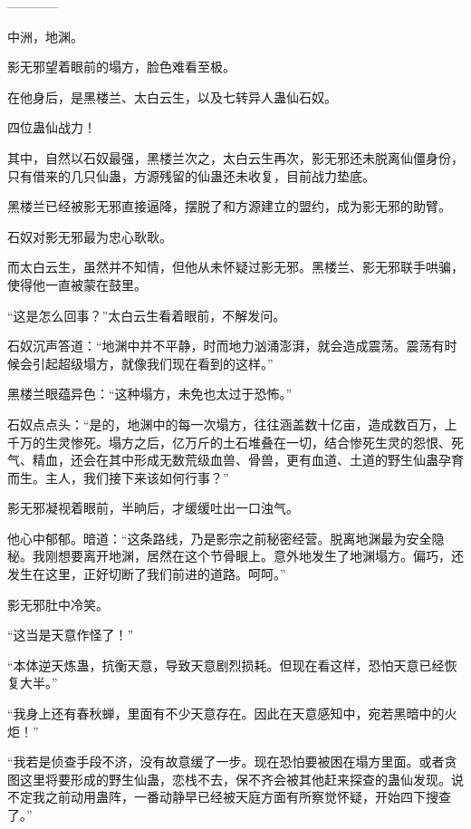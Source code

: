 
\begin{this_body}

------------

中洲，地渊。

影无邪望着眼前的塌方，脸色难看至极。

在他身后，是黑楼兰、太白云生，以及七转异人蛊仙石奴。

四位蛊仙战力！

其中，自然以石奴最强，黑楼兰次之，太白云生再次，影无邪还未脱离仙僵身份，只有借来的几只仙蛊，方源残留的仙蛊还未收复，目前战力垫底。

黑楼兰已经被影无邪直接逼降，摆脱了和方源建立的盟约，成为影无邪的助臂。

石奴对影无邪最为忠心耿耿。

而太白云生，虽然并不知情，但他从未怀疑过影无邪。黑楼兰、影无邪联手哄骗，使得他一直被蒙在鼓里。

“这是怎么回事？”太白云生看着眼前，不解发问。

石奴沉声答道：“地渊中并不平静，时而地力汹涌澎湃，就会造成震荡。震荡有时候会引起超级塌方，就像我们现在看到的这样。”

黑楼兰眼蕴异色：“这种塌方，未免也太过于恐怖。”

石奴点点头：“是的，地渊中的每一次塌方，往往涵盖数十亿亩，造成数百万，上千万的生灵惨死。塌方之后，亿万斤的土石堆叠在一切，结合惨死生灵的怨恨、死气、精血，还会在其中形成无数荒级血兽、骨兽，更有血道、土道的野生仙蛊孕育而生。主人，我们接下来该如何行事？”

影无邪凝视着眼前，半晌后，才缓缓吐出一口浊气。

他心中郁郁。暗道：“这条路线，乃是影宗之前秘密经营。脱离地渊最为安全隐秘。我刚想要离开地渊，居然在这个节骨眼上。意外地发生了地渊塌方。偏巧，还发生在这里，正好切断了我们前进的道路。呵呵。”

影无邪肚中冷笑。

“这当是天意作怪了！”

“本体逆天炼蛊，抗衡天意，导致天意剧烈损耗。但现在看这样，恐怕天意已经恢复大半。”

“我身上还有春秋蝉，里面有不少天意存在。因此在天意感知中，宛若黑暗中的火炬！”

“我若是侦查手段不济，没有故意缓了一步。现在恐怕要被困在塌方里面。或者贪图这里将要形成的野生仙蛊，恋栈不去，保不齐会被其他赶来探查的蛊仙发现。说不定我之前动用蛊阵，一番动静早已经被天庭方面有所察觉怀疑，开始四下搜查了。”


\end{this_body}
